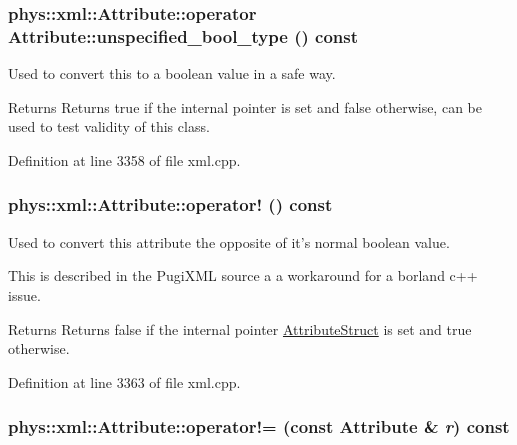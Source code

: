 \hypertarget{classphys_1_1xml_1_1Attribute_ab2cf442667b8ad1b443f0512ccaedcf9}{
\subsubsection[{operator unspecified\_\-bool\_\-type}]{\setlength{\rightskip}{0pt plus 5cm}phys::xml::Attribute::operator Attribute::unspecified\_\-bool\_\-type () const}}
\label{da/ddf/classphys_1_1xml_1_1Attribute_ab2cf442667b8ad1b443f0512ccaedcf9}


Used to convert this to a boolean value in a safe way. 

\begin{DoxyReturn}{Returns}
Returns true if the internal pointer is set and false otherwise, can be used to test validity of this class. 
\end{DoxyReturn}


Definition at line 3358 of file xml.cpp.

\hypertarget{classphys_1_1xml_1_1Attribute_a18cb9f6900b0fc9e246b36d90e5bea5b}{
\subsubsection[{operator!}]{\setlength{\rightskip}{0pt plus 5cm}phys::xml::Attribute::operator! () const}}
\label{da/ddf/classphys_1_1xml_1_1Attribute_a18cb9f6900b0fc9e246b36d90e5bea5b}


Used to convert this attribute the opposite of it's normal boolean value. 

This is described in the PugiXML source a a workaround for a borland c++ issue. \begin{DoxyReturn}{Returns}
Returns false if the internal pointer \hyperlink{structphys_1_1xml_1_1AttributeStruct}{AttributeStruct} is set and true otherwise. 
\end{DoxyReturn}


Definition at line 3363 of file xml.cpp.

\hypertarget{classphys_1_1xml_1_1Attribute_ae2371203e07dd781d2b38ba403b00816}{
\subsubsection[{operator!=}]{\setlength{\rightskip}{0pt plus 5cm}phys::xml::Attribute::operator!= (const {\bf Attribute} \& {\em r}) const}}
\label{da/ddf/classphys_1_1xml_1_1Attribute_ae2371203e07dd781d2b38ba403b00816}


